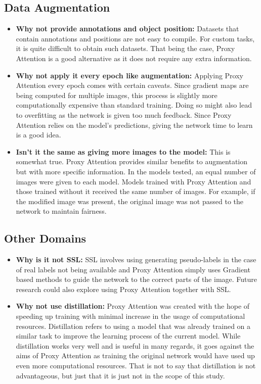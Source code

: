 \documentclass[a4paper,11pt,openright]{book}
\begin{document}
\subsection{Data Augmentation}
\begin{itemize}
    \item \textbf{Why not provide annotations and object position: }Datasets that contain annotations and positions are not easy to compile. For custom tasks, it is quite difficult to obtain such datasets. That being the case, Proxy Attention is a good alternative as it does not require any extra information.

    \item \textbf{Why not apply it every epoch like augmentation: } Applying Proxy Attention every epoch comes with certain caveats. Since gradient maps are being computed for multiple images, this process is slightly more computationally expensive than standard training. Doing so might also lead to overfitting as the network is given too much feedback. Since Proxy Attention relies on the model's predictions, giving the network time to learn is a good idea.

    \item \textbf{Isn't it the same as giving more images to the model: } This is somewhat true. Proxy Attention provides similar benefits to augmentation but with more specific information. In the models tested, an equal number of images were given to each model. Models trained with Proxy Attention and those trained without it received the same number of images. For example, if the modified image was present, the original image was not passed to the network to maintain fairness.
\end{itemize}

\subsection{Other Domains}
\begin{itemize}
\item \textbf{Why is it not SSL:} SSL involves using generating pseudo-labels in the case of real labels not being available and Proxy Attention simply uses Gradient based methods to guide the network to the correct parts of the image. Future research could also explore using Proxy Attention together with SSL.
\item \textbf{Why not use distillation:} Proxy Attention was created with the hope of speeding up training with minimal increase in the usage of computational resources. Distillation refers to using a model that was already trained on a similar task to improve the learning process of the current model. While distillation works very well and is useful in many regards, it goes against the aims of Proxy Attention as training the original network would have used up even more computational resources. That is not to say that distillation is not advantageous, but just that it is just not in the scope of this study.
\end{itemize}
\end{document}
